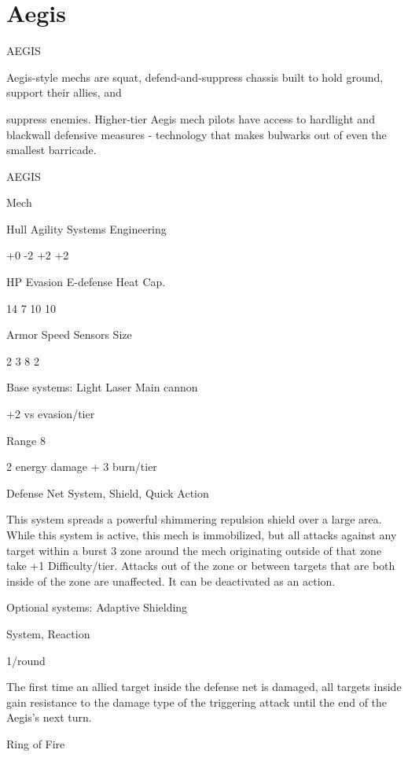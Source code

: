 \section{Aegis}

                                                 AEGIS

Aegis-style mechs are squat, defend-and-suppress chassis built to hold ground, support their allies, and

suppress enemies. Higher-tier Aegis mech pilots have access to hardlight and blackwall defensive
measures - technology that makes bulwarks out of even the smallest barricade.

 AEGIS

 Mech

 Hull       Agility      Systems       Engineering

 +0         -2           +2            +2

 HP         Evasion      E-defense     Heat Cap.

 14         7            10            10

 Armor      Speed        Sensors       Size

 2          3            8             2

Base systems:
Light Laser
Main cannon

+2 vs evasion/tier

Range 8

2 energy damage + 3 burn/tier


Defense Net
System, Shield, Quick Action

This system spreads a powerful shimmering repulsion shield over a large area. While this system
is active, this mech is immobilized, but all attacks against any target within a burst 3 zone around
the mech originating outside of that zone take +1 Difficulty/tier. Attacks out of the zone or
between targets that are both inside of the zone are unaffected. It can be deactivated as an
action.


Optional systems:
Adaptive Shielding

System, Reaction

1/round

The first time an allied target inside the defense net is damaged, all targets inside gain resistance
to the damage type of the triggering attack until the end of the Aegis’s next turn.


Ring of Fire





